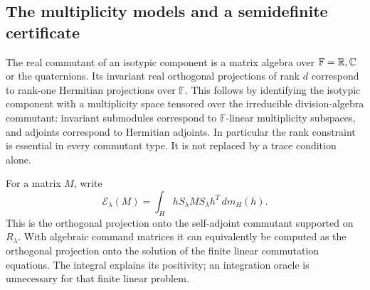 \subsection{The multiplicity models and a semidefinite certificate}
The real commutant of an isotypic component is a matrix algebra over $\mathbb F=\mathbb R,\mathbb C$ or the quaternions. Its invariant real orthogonal projections of rank $d$ correspond to rank-one Hermitian projections over $\mathbb F$. This follows by identifying the isotypic component with a multiplicity space tensored over the irreducible division-algebra commutant: invariant submodules correspond to $\mathbb F$-linear multiplicity subspaces, and adjoints correspond to Hermitian adjoints. In particular the rank constraint is essential in every commutant type. It is not replaced by a trace condition alone.

For a matrix $M$, write
\[
 \mathcal E_\lambda(M)=\int_H hS_\lambda M S_\lambda h^T\,dm_H(h).
\]
This is the orthogonal projection onto the self-adjoint commutant supported on $R_\lambda$. With algebraic command matrices it can equivalently be computed as the orthogonal projection onto the solution of the finite linear commutation equations. The integral explains its positivity; an integration oracle is unnecessary for that finite linear problem.

